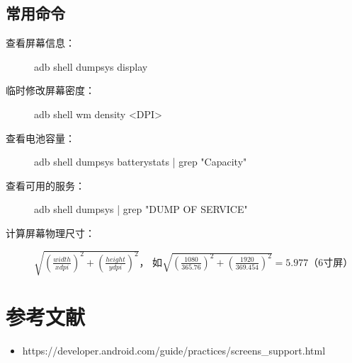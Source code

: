 \documentclass[a4paper,11pt]{article}
\begin{document}
\subsection[常用命令]{常用命令}

\begin{description}
  \item[查看屏幕信息：] adb shell dumpsys display
  \item[临时修改屏幕密度：] adb shell wm density <DPI>
  \item[查看电池容量：] adb shell dumpsys batterystats | grep "Capacity"
  \item[查看可用的服务：] adb shell dumpsys | grep "DUMP OF SERVICE"
  \item[计算屏幕物理尺寸：] $\sqrt{(\frac{width}{xdpi})^2 + (\frac{height}{ydpi})^2}$，
  如$\sqrt{(\frac{1080}{365.76})^2 + (\frac{1920}{369.454})^2} = 5.977$（6寸屏）
\end{description}


\section[参考文献]{参考文献}
\begin{itemize}
  \item https://developer.android.com/guide/practices/screens_support.html
\end{itemize}
\end{document}
